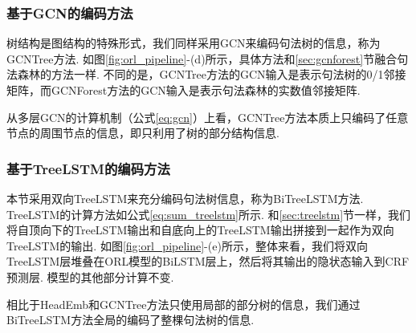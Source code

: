 \subsubsection{基于GCN的编码方法}

树结构是图结构的特殊形式，我们同样采用GCN来编码句法树的信息，称为GCNTree方法.
如图\ref{fig:orl_pipeline}-(d)所示，具体方法和\ref{sec:gcnforest}节融合句法森林的方法一样.
不同的是，GCNTree方法的GCN输入是表示句法树的0/1邻接矩阵，而GCNForest方法的GCN输入是表示句法森林的实数值邻接矩阵.


从多层GCN的计算机制（公式\ref{eq:gcn}）上看，GCNTree方法本质上只编码了任意节点的周围节点的信息，即只利用了树的部分结构信息.

\subsubsection{基于TreeLSTM的编码方法}
本节采用双向TreeLSTM来充分编码句法树信息，称为BiTreeLSTM方法. TreeLSTM的计算方法如公式\ref{eq:sum_treelstm}所示. 和\ref{sec:treelstm}节一样，我们将自顶向下的TreeLSTM输出和自底向上的TreeLSTM输出拼接到一起作为双向TreeLSTM的输出.
%
%
如图\ref{fig:orl_pipeline}-(e)所示，整体来看，我们将双向TreeLSTM层堆叠在ORL模型的BiLSTM层上，然后将其输出的隐状态输入到CRF预测层. 模型的其他部分计算不变.

相比于HeadEmb和GCNTree方法只使用局部的部分树的信息，我们通过BiTreeLSTM方法全局的编码了整棵句法树的信息.

